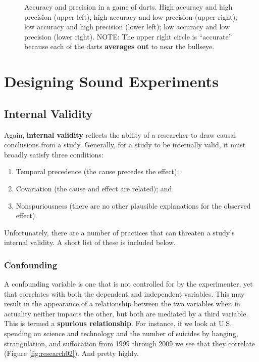\begin{figure*}[htp]
\caption{Accuracy and precision in a game of darts. High accuracy and high precision (upper left); high accuracy and low precision (upper right); low accuracy and high precision (lower left); low accuracy and low precision (lower right). NOTE: The upper right circle is ``accurate'' because each of the darts \textbf{averages out} to near the bullseye.}
\label{fig:research01}
\end{figure*}

\section{Designing Sound Experiments}

\subsection{Internal Validity}
Again, \textbf{internal validity}  reflects the ability of a researcher to draw causal conclusions from a study. Generally, for a study to be internally valid, it must broadly satisfy three conditions:

\begin{enumerate}
  \item Temporal precedence (the cause precedes the effect);
  \item Covariation (the cause and effect are related); and
  \item Nonspuriousness (there are no other plausible explanations for the observed effect).
\end{enumerate}

Unfortunately, there are a number of practices that can threaten a study's internal validity. A short list of these is included below.

\subsubsection{Confounding}
A confounding variable is one that is not controlled for by the experimenter, yet that correlates with both the dependent and independent variables. This may result in the appearance of a relationship between the two variables when in actuality neither impacts the other, but both are mediated by a third variable. This is termed a \textbf{spurious relationship}. For instance, if we look at U.S. spending on science and technology and the number of suicides by hanging, strangulation, and suffocation from 1999 through 2009 we see that they correlate (Figure \ref{fig:research02}). And pretty highly. 


